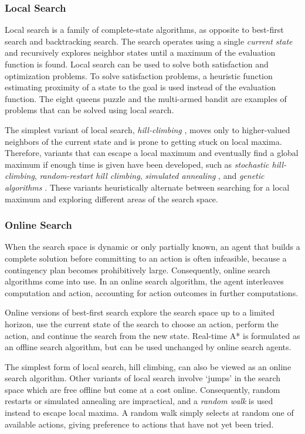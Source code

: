 \subsubsection{Local Search}

Local search is a family of complete-state algorithms, as opposite to
best-first search and backtracking search. The search operates using a
single {\em current state} and recursively explores neighbor states
until a maximum of the evaluation function is found. Local search can
be used to solve both satisfaction and optimization problems. To solve
satisfaction problems, a heuristic function estimating proximity of a
state to the goal is used instead of the evaluation function. The
eight queens puzzle and the multi-armed bandit are examples of
problems that can be solved using local search.

The simplest variant of local search, {\em hill-climbing}
\cite{Russell.aima}, moves only to higher-valued neighbors of the
current state and is prone to getting stuck on local maxima. Therefore,
variants that can escape a local maximum and eventually find a global
maximum if enough time is given have been developed, such as {\em
stochastic hill-climbing}, {\em random-restart hill climbing}, {\em
simulated annealing} \cite{Russell.aima}, and {\em genetic algorithms}
\cite{Eiben.evolcomp}. These variants heuristically alternate between
searching for a local maximum and exploring different areas of the
search space.

\subsubsection{Online Search}

When the search space is dynamic or only partially known, an agent
that builds a complete solution before committing to an action is
often infeasible, because a contingency plan becomes prohibitively
large. Consequently, online search algorithms come into use. In an
online search algorithm, the agent interleaves computation and action,
accounting for action outcomes in further computations.

Online versions of best-first search explore the search space up to
a limited horizon, use the current state of the search to choose an
action, perform the action, and continue the search from the new
state. Real-time A* is formulated as an offline search algorithm,
but can be used unchanged by online search agents.

The simplest form of local search, hill climbing, can also be
viewed as an online search algorithm. Other variants of local search
involve `jumps' in the search space which are free offline but come at
a cost online. Consequently, random restarts or simulated annealing
are impractical, and a {\em random walk} is used instead to escape
local maxima. A random walk simply selects at random one of available
actions, giving preference to actions that have not yet been tried.

